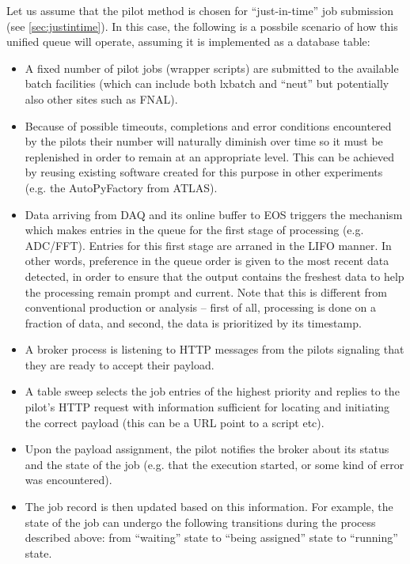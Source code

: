\documentclass[pdftex,12pt,letter]{article}
\begin{document}
Let us assume that the pilot method is chosen for ``just-in-time'' job submission (see \ref{sec:justintime}). In this
case, the following is a possbile scenario of how this unified queue will operate, assuming it is implemented
as a database table:
\begin{itemize}

\item A fixed number of pilot jobs (wrapper scripts) are submitted to the available batch facilities (which can include both
lxbatch and ``neut'' but potentially also other sites such as FNAL).

\item Because of possible timeouts, completions and error conditions encountered by the pilots their number will naturally
diminish over time so it must be replenished in order to remain at an appropriate level. This can be achieved by reusing
existing software created for this purpose in other experiments (e.g. the AutoPyFactory from ATLAS).

\item Data arriving from DAQ and its online buffer to EOS triggers the mechanism which makes entries in the queue for the
first stage of processing (e.g. ADC/FFT). Entries for this first stage are arraned in the LIFO manner. In other words, preference
in the queue order is given to the most recent data detected, in order to ensure that the output contains the freshest
data to help the processing remain prompt and current. Note that this is different from conventional production or analysis --
first of all, processing is done on a fraction of data, and second, the data is prioritized by its timestamp.

\item A broker process is listening to HTTP messages from the pilots signaling that they are ready to accept their payload.

\item A table sweep selects the job entries of the highest priority and replies to the pilot's HTTP request with information
sufficient for locating and initiating the correct payload (this can be a URL point to a script etc).

\item Upon the payload assignment, the pilot notifies the broker about its status and the state of the job (e.g.
that the execution started, or some kind of error was encountered).

\item The job record is then updated based on this information. For example, the state of the job can undergo the following
transitions  during the process described above: from ``waiting'' state to ``being assigned'' state to ``running'' state.


\end{itemize}
\end{document}
